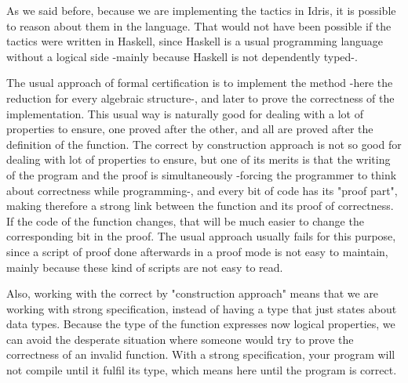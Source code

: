 As we said before, because we are implementing the tactics in Idris, it is possible to reason about them in the language. That would not have been possible if the tactics were written in Haskell, since Haskell is a usual programming language without a logical side -mainly because Haskell is not dependently typed-.

The usual approach of formal certification is to implement the method -here the reduction for every algebraic structure-, and later to prove the correctness of the implementation. This usual way is naturally good for dealing with a lot of properties to ensure, one proved after the other, and all are proved after the definition of the function. The correct by construction approach is not so good for dealing with lot of properties to ensure, but one of its merits is that the writing of the program and the proof is simultaneously -forcing the programmer to think about correctness while programming-, and every bit of code has its "proof part", making therefore a strong link between the function and its proof of correctness. If the code of the function changes, that will be much easier to change the corresponding bit in the proof. The usual approach usually fails for this purpose, since a script of proof done afterwards in a proof mode is not easy to maintain, mainly because these kind of scripts are not easy to read.

Also, working with the correct by "construction approach" means that we are working with strong specification, instead of having a type that just states about data types. Because the type of the function expresses now logical properties, we can avoid the desperate situation where someone would try to prove the correctness of an invalid function. With a strong specification, your program will not compile until it fulfil its type, which means here until the program is correct.